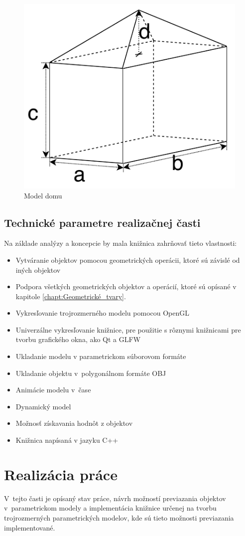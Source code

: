 \begin{figure}[H]
	\centering
	\includegraphics[height=0.3\textwidth]{obrazky-figures/Examples/B4.pdf}
	\caption{Model domu}
	\label{fig:Intersection}
\end{figure}



\section{Technické parametre realizačnej časti}
Na základe analýzy a koncepcie  by mala knižnica zahrňovať tieto vlastnosti:
\begin{itemize}
\item Vytváranie objektov pomocou geometrických operácii, ktoré sú závislé od iných objektov
\item Podpora všetkých geometrických objektov a operácií, ktoré sú opísané v kapitole \ref{chapt:Geometrické_tvary}. 
\item Vykresľovanie trojrozmerného modelu pomocou OpenGL 
\item Univerzálne vykresľovanie knižnice, pre použitie s rôznymi knižnicami pre tvorbu grafického okna, ako Qt a GLFW
\item Ukladanie modelu v parametrickom súborovom formáte
\item Ukladanie objektu v~polygonálnom formáte  OBJ
\item Animácie modelu v~čase
\item Dynamický model
\item Možnosť získavania hodnôt z objektov
\item Knižnica napísaná v jazyku C++
\end{itemize}



\chapter{Realizácia práce}
V~tejto časti je opísaný stav práce, návrh možností previazania objektov v~parametrickom modely a implementácia knižnice určenej na tvorbu trojrozmerných parametrických modelov, kde sú tieto možnosti previazania implementované.  

